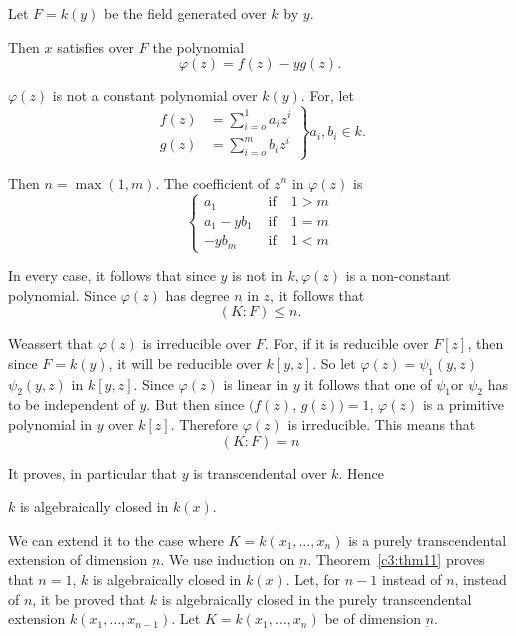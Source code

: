 Let $F=k(y)$ be the field generated over $k$ by $y$. 

Then $x$ satisfies over $F$ the polynomial
$$
\varphi(z) = f(z) -yg(z) .
$$

$\varphi(z)$ is not a constant polynomial over $k(y)$. For, let 
\begin{equation*}
\left.
\begin{aligned}
f(z)&= \sum^1_{i=o} a_i z^i\\
g(z)& = \sum^m_{i=o} b_i z^i
\end{aligned}
\right\}
a_i,b_i \in k .
\end{equation*}

Then $n= \max (1,m)$. The coefficient of $z^n$ in $\varphi(z)$ is 
\begin{equation*}
\begin{cases}
a_1 & \text{ if} \quad 1 >m\\
a_1 -yb_1 & \text{ if}\quad  1=m\\
-yb_m & \text{ if} \quad 1<m
\end{cases}
\end{equation*}

In every case, it follows that since $y$ is not in $k, \varphi(z)$ is
a non-constant polynomial. Since $\varphi(z)$ has degree $n$ in $z$,
it follows that  
$$
(K:F) \leq n.
$$

We\pageoriginale assert that $\varphi(z)$ is irreducible over
$F$. For, if it is 
reducible over $F[z]$, then since $F=k(y)$, it will be reducible over
$k[y,z]$. So let $\varphi(z) = \psi_1(y,z)$  $\psi_2(y,z)$ in
$k[y,z]$. Since $\varphi(z)$ is linear in $y$ it follows that  one of
$\psi_1$or $\psi_2$ has to be independent of $y$. But then since
$(f(z)$, $g(z))=1$, $\varphi(z)$ is a primitive polynomial in $y$ over
$k[z]$. Therefore $ \varphi(z)$ is irreducible. This means that  
$$
(K:F)=n
$$

It proves, in particular that $y$ is transcendental over $k$. Hence  

\begin{thm}\label{c3:thm11}%
$k$ is algebraically closed in $k(x)$.
\end{thm} 

We can extend it to the case where $K=k(x_1, \ldots,x_n)$ is a purely
transcendental extension of dimension $\underbar{n}$. We use induction
on $\underbar{n}$. Theorem~\ref{c3:thm11} proves that $n=1$, $k$ is
algebraically 
closed in $k(x)$. Let, for $n-1$ instead of $n$, instead of $n$, it be
proved that $k$ is algebraically closed in the purely transcendental
extension $k(x_1, \ldots,x_{n-1})$. Let $K=k(x_1, \ldots,x_n)$ be of
dimension $\underbar{n}$. 

